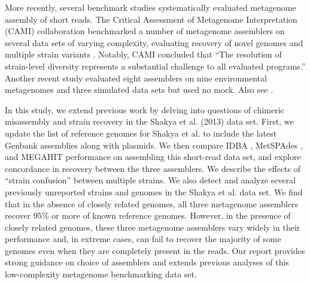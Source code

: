 \documentclass[11pt]{article}
\begin{document}

More recently, several benchmark studies systematically evaluated
metagenome assembly of short reads.  The Critical Assessment of
Metagenome Interpretation (CAMI) collaboration benchmarked a number of
metagenome assemblers on several data sets of varying complexity,
evaluating recovery of novel genomes and multiple strain variants
\cite{CAMI}.  Notably, CAMI concluded that ``The resolution of
strain-level diversity represents a substantial challenge to all
evaluated programs.''  Another recent study evaluated eight assemblers
on nine environmental metagenomes and three simulated data sets
\cite{metag_one} but used no mock. Also see \cite{Greenwald2017}.

In this study, we extend previous work by delving into questions of
chimeric misassembly and strain recovery in the Shakya et al. (2013)
data set.  First, we update the list of reference genomes for Shakya
et al. to include the latest Genbank assemblies along with
plasmids. We then compare IDBA \cite{idba}, MetSPAdes \cite{metaspades},
and MEGAHIT \cite{megahit} performance on assembling this short-read
data set, and explore concordance in recovery between the three
assemblers.  We describe the effects of ``strain confusion'' between
multiple strains.  We also detect and analyze several previously
unreported strains and genomes in the Shakya et al. data set.  We find
that in the absence of closely related genomes, all three metagenome
assemblers recover 95\% or more of known reference genomes.  However,
in the presence of closely related genomes, these three metagenome
assemblers vary widely in their performance and, in extreme cases, can
fail to recover the majority of some genomes even when they are
completely present in the reads.  Our report provides strong guidance
on choice of assemblers and extends previous analyses of this
low-complexity metagenome benchmarking data set.




\end{document}
